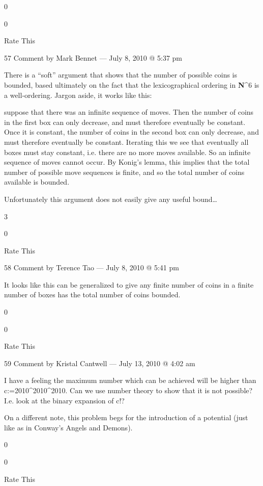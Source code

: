     0
     
    0
     
    Rate This

    57 Comment by Mark Bennet — July 8, 2010 @ 5:37 pm

    There is a “soft” argument that shows that the number of possible
    coins is bounded, based ultimately on the fact that the
    lexicographical ordering in {\bf N}^6 is a well-ordering. Jargon
    aside, it works like this:

    suppose that there was an infinite sequence of moves. Then the
    number of coins in the first box can only decrease, and must
    therefore eventually be constant. Once it is constant, the number
    of coins in the second box can only decrease, and must therefore
    eventually be constant. Iterating this we see that eventually all
    boxes must stay constant, i.e. there are no more moves
    available. So an infinite sequence of moves cannot occur. By
    Konig’s lemma, this implies that the total number of possible move
    sequences is finite, and so the total number of coins available is
    bounded.

    Unfortunately this argument does not easily give any useful bound…
     
    3
     
    0
     
    Rate This

    58 Comment by Terence Tao — July 8, 2010 @ 5:41 pm

        It looks like this can be generalized to give any finite number of coins in a finite number of boxes
        has the total number of coins bounded.
         
        0
         
        0
         
        Rate This

        59 Comment by Kristal Cantwell — July 13, 2010 @ 4:02 am

    I have a feeling the maximum number which can be achieved will be higher than c:=2010^2010^2010.
    Can we use number theory to show that it is not possible? I.e. look at the binary expansion of c!?

    On a different note, this problem begs for the introduction of a potential (just like as in Conway’s Angels and Demons).
     
    0
     
    0
     
    Rate This

